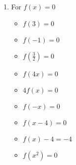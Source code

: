 \documentclass{ximera}
\begin{document}
\begin{enumerate}
\begin{multicols}{3}
\begin{itemize}
\item  $f(x-4) = 6$ 

\item $f(x) - 4 = 2$
     
\item  $f\left(x^2\right) = 6$

\end{itemize}
\end{multicols}



\item For $f(x) = 0$ 

\begin{multicols}{3}
\begin{itemize}
\item $f(3) = 0$
\item $f(-1) =0$
\item $f\left(\frac{3}{2} \right) = 0$
\end{itemize}
\end{multicols}

\begin{multicols}{3}
\begin{itemize}
\item  $f(4x) = 0$
\item $4f(x) = 0$
\item $f(-x) = 0$
\end{itemize}
\end{multicols}

\begin{multicols}{3}
\begin{itemize}

\item  $f(x-4) = 0$ 

\item $f(x) - 4 = -4$
     
\item  $f\left(x^2\right) = 0$

\end{itemize}
\end{multicols}

\setcounter{HW}{\value{enumi}}
\end{enumerate}
\end{document}
